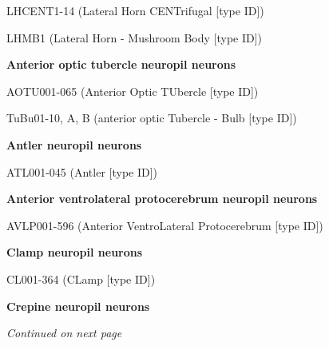 \documentclass{article}
\begin{document}
{\noindent\hspace*{1.0em}LHCENT1-14 (Lateral Horn CENTrifugal [type ID])\par
\noindent\hspace*{1.0em}LHMB1 (Lateral Horn - Mushroom Body [type ID])\par
\noindent\textbf{Anterior optic tubercle neuropil neurons}\par
\noindent\hspace*{1.0em}AOTU001-065 (Anterior Optic TUbercle [type ID])\par
\noindent\hspace*{1.0em}TuBu01-10, A, B (anterior optic Tubercle - Bulb [type ID])\par
\noindent\textbf{Antler neuropil neurons}\par
\noindent\hspace*{1.0em}ATL001-045 (Antler [type ID])\par
\noindent\textbf{Anterior ventrolateral protocerebrum neuropil neurons}\par
\noindent\hspace*{1.0em}AVLP001-596 (Anterior VentroLateral Protocerebrum [type ID])\par
\noindent\textbf{Clamp neuropil neurons}\par
\noindent\hspace*{1.0em}CL001-364 (CLamp [type ID])\par
\noindent\textbf{Crepine neuropil neurons}\par
}
\noindent\emph{Continued on next page}
\end{document}

